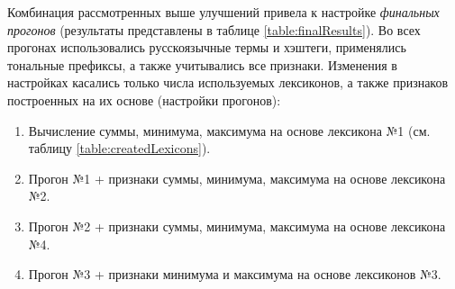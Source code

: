 

Комбинация рассмотренных выше улучшений привела к настройке {\it финальных
прогонов} (результаты представлены в таблице \ref{table:finalResults}).
Во всех прогонах использовались русскоязычные термы и хэштеги, применялись
тональные префиксы, а также учитывались все признаки. Изменения в настройках
касались только числа используемых лексиконов, а также признаков построенных
на их основе (настройки прогонов):
\begin{enumerate}
    \item Вычисление суммы, минимума, максимума на основе лексикона №1 (см. таблицу \ref{table:createdLexicons}).
    \item Прогон №1 + признаки суммы, минимума, максимума на основе лексикона №2.
    \item Прогон №2 + признаки суммы, минимума, максимума на основе лексикона №4.
    \item Прогон №3 + признаки минимума и максимума на основе лексиконов №3.
\end{enumerate}


